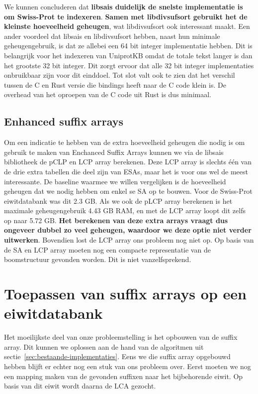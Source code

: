 We kunnen concluderen dat \textbf{libsais duidelijk de snelste implementatie is om Swiss-Prot te indexeren}.
\textbf{Samen met libdivsufsort gebruikt het de kleinste hoeveelheid geheugen}, wat libdivsufsort ook interessant maakt.
Een ander voordeel dat libsais en libdivsufsort hebben, naast hun minimale geheugengebruik, is dat ze allebei een 64 bit integer implementatie hebben.
Dit is belangrijk voor het indexeren van UniprotKB omdat de totale tekst langer is dan het grootste 32 bit integer.
Dit zorgt ervoor dat alle 32 bit integer implementaties onbruikbaar zijn voor dit einddoel.
Tot slot valt ook te zien dat het verschil tussen de C en Rust versie die bindings heeft naar de C code klein is.
De overhead van het oproepen van de C code uit Rust is dus minimaal.

\subsection{Enhanced suffix arrays}\label{subsec:enhanced-suffix-arrays}
Om een indicatie te hebben van de extra hoeveelheid geheugen die nodig is om gebruik te maken van Enchanced Suffix Arrays kunnen we via de libsais bibliotheek de pCLP en LCP array berekenen.
Deze LCP array is slechts één van de drie extra tabellen die deel zijn van ESAs, maar het is voor ons wel de meest interessante.
De baseline waarmee we willen vergelijken is de hoeveelheid geheugen dat we nodig hebben om enkel se SA op te bouwen.
Voor de Swiss-Prot eiwitdatabank was dit 2.3 GB\@.
Als we ook de pLCP array berekenen is het maximale geheugengebruik 4.43 GB RAM, en met de LCP array loopt dit zelfs op naar 5.72 GB\@.
\textbf{Het berekenen van deze extra arrays vraagt dus ongeveer dubbel zo veel geheugen, waardoor we deze optie niet verder uitwerken}.
Bovendien lost de LCP array ons probleem nog niet op.
Op basis van de SA en LCP array moeten nog een compacte representatie van de boomstructuur gevonden worden.
Dit is niet vanzelfsprekend.

\section{Toepassen van suffix arrays op een eiwitdatabank}\label{sec:toepassen-van-suffix-arrays-op-een-eiwitdatabank}
Het moeilijkste deel van onze probleemstelling is het opbouwen van de suffix array.
Dit kunnen we oplossen aan de hand van de algoritmen uit sectie~\ref{sec:bestaande-implementaties}.
Eens we die suffix array opgebouwd hebben blijft er echter nog een stuk van ons probleem over.
Eerst moeten we nog een mapping maken van de gevonden suffixen naar het bijbehorende eiwit.
Op basis van dit eiwit wordt daarna de LCA gezocht.

